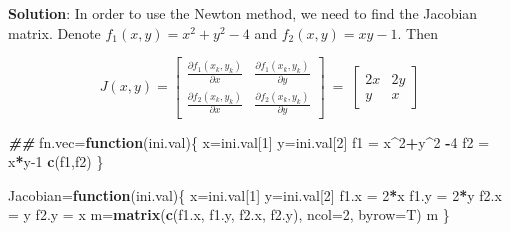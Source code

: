 \documentclass[
]{book}
\newenvironment{Shaded}{\begin{snugshade}}{\end{snugshade}}
\newcommand{\AttributeTok}[1]{\textcolor[rgb]{0.13,0.29,0.53}{#1}}
\newcommand{\ControlFlowTok}[1]{\textcolor[rgb]{0.13,0.29,0.53}{\textbf{#1}}}
\newcommand{\DecValTok}[1]{\textcolor[rgb]{0.00,0.00,0.81}{#1}}
\newcommand{\DocumentationTok}[1]{\textcolor[rgb]{0.56,0.35,0.01}{\textbf{\textit{#1}}}}
\newcommand{\FunctionTok}[1]{\textcolor[rgb]{0.13,0.29,0.53}{\textbf{#1}}}
\newcommand{\NormalTok}[1]{#1}
\newcommand{\OtherTok}[1]{\textcolor[rgb]{0.56,0.35,0.01}{#1}}
\newcommand{\SpecialCharTok}[1]{\textcolor[rgb]{0.81,0.36,0.00}{\textbf{#1}}}
\begin{document}
\textbf{Solution}: In order to use the Newton method, we need to find the
Jacobian matrix. Denote \(f_1(x,y) = x^2 + y^2 -4\) and
\(f_2(x,y) = xy -1\). Then

\[
J(x,y) = \left[
\begin{array}{cc}
\frac{\partial f_1(x_k, y_k)}{\partial x} & \frac{\partial f_1(x_k,y_k)}{\partial y}\\
\frac{\partial f_2(x_k, y_k)}{\partial x} & \frac{\partial f_2(x_k,y_k)}{\partial y}
\end{array}
\right]
~=~
\left[
\begin{array}{cc}
2x & 2y\\
y & x
\end{array}
\right]
\]

\begin{Shaded}
\begin{Highlighting}[]
\DocumentationTok{\#\#}
\NormalTok{fn.vec}\OtherTok{=}\ControlFlowTok{function}\NormalTok{(ini.val)\{}
\NormalTok{ x}\OtherTok{=}\NormalTok{ini.val[}\DecValTok{1}\NormalTok{]}
\NormalTok{ y}\OtherTok{=}\NormalTok{ini.val[}\DecValTok{2}\NormalTok{]}
\NormalTok{ f1 }\OtherTok{=}\NormalTok{ x}\SpecialCharTok{\^{}}\DecValTok{2}\SpecialCharTok{+}\NormalTok{y}\SpecialCharTok{\^{}}\DecValTok{2} \SpecialCharTok{{-}}\DecValTok{4}
\NormalTok{ f2 }\OtherTok{=}\NormalTok{ x}\SpecialCharTok{*}\NormalTok{y}\DecValTok{{-}1}
 \FunctionTok{c}\NormalTok{(f1,f2)}
\NormalTok{\}}

\NormalTok{Jacobian}\OtherTok{=}\ControlFlowTok{function}\NormalTok{(ini.val)\{}
\NormalTok{ x}\OtherTok{=}\NormalTok{ini.val[}\DecValTok{1}\NormalTok{]}
\NormalTok{ y}\OtherTok{=}\NormalTok{ini.val[}\DecValTok{2}\NormalTok{]}
\NormalTok{ f1.x }\OtherTok{=} \DecValTok{2}\SpecialCharTok{*}\NormalTok{x}
\NormalTok{ f1.y }\OtherTok{=} \DecValTok{2}\SpecialCharTok{*}\NormalTok{y}
\NormalTok{ f2.x }\OtherTok{=}\NormalTok{ y}
\NormalTok{ f2.y }\OtherTok{=}\NormalTok{ x}
\NormalTok{ m}\OtherTok{=}\FunctionTok{matrix}\NormalTok{(}\FunctionTok{c}\NormalTok{(f1.x, f1.y, f2.x, f2.y), }\AttributeTok{ncol=}\DecValTok{2}\NormalTok{, }\AttributeTok{byrow=}\NormalTok{T)}
\NormalTok{ m}
\NormalTok{\}}


\end{Highlighting}
\end{Shaded}
\end{document}
